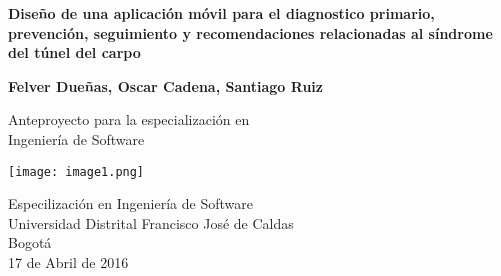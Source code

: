 \begin{titlepage}
    \begin{center}
        \vspace*{1cm}
        
        \textbf{Diseño de una aplicación móvil para el diagnostico primario, prevención, seguimiento y  recomendaciones relacionadas al síndrome del túnel del carpo}
        
        \vspace{0.5cm}
        
        \vspace{1.5cm}
        
        \textbf{Felver Dueñas, Oscar Cadena, Santiago Ruiz}
        
        \vfill
        
       Anteproyecto para la especialización en\\
        Ingeniería de Software
        
        \vspace{0.8cm}
        
        \texttt{[image: image1.png]}
        
        Especilización en Ingeniería de Software\\
        Universidad Distrital Francisco José de Caldas\\
        Bogotá \\
        17 de Abril de 2016
        
    \end{center}
\end{titlepage}